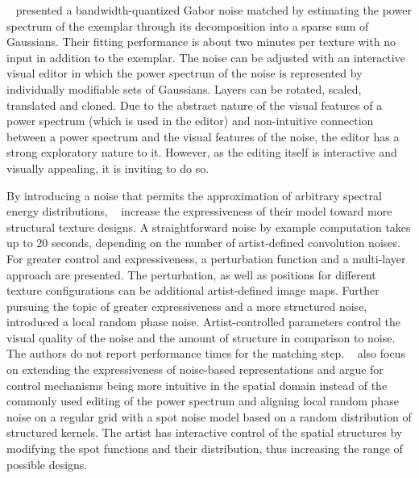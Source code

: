 \citeauthor*{galerne_2012_gne}~\cite{galerne_2012_gne} presented a bandwidth-quantized Gabor noise matched by estimating the power spectrum of the exemplar through its decomposition into a sparse sum of Gaussians. Their fitting performance is about two minutes per texture with no input in addition to the exemplar. The noise can be adjusted with an interactive visual editor in which the power spectrum of the noise is represented by individually modifiable sets of Gaussians. Layers can be rotated, scaled, translated and cloned. Due to the abstract nature of the visual features of a power spectrum (which is used in the editor) and non-intuitive connection between a power spectrum and the visual features of the noise, the editor has a strong exploratory nature to it. However, as the editing itself is interactive and visually appealing, it is inviting to do so. 

By introducing a noise that permits the approximation of arbitrary spectral energy distributions, \citeauthor*{gilet_2012_mkn}~\cite{gilet_2012_mkn} increase the expressiveness of their model toward more structural texture designs. A straightforward noise by example computation takes up to 20 seconds, depending on the number of artist-defined convolution noises. For greater control and expressiveness, a perturbation function and a multi-layer approach are presented. The perturbation, as well as positions for different texture configurations can be additional artist-defined image maps. Further pursuing the topic of greater expressiveness and a more structured noise, \citeauthor*{gilet_2014_lrn}~\cite{gilet_2014_lrn} introduced a local random phase noise. Artist-controlled parameters control the visual quality of the noise and the amount of structure in comparison to noise. The authors do not report performance times for the matching step. \citeauthor*{pavie_2016_pts}~\cite{pavie_2016_pts} also focus on extending the expressiveness of noise-based representations and argue for control mechanisms being more intuitive in the spatial domain instead of the commonly used editing of the power spectrum and aligning local random phase noise on a regular grid with a spot noise model based on a random distribution of structured kernels. The artist has interactive control of the spatial structures by modifying the spot functions and their distribution, thus increasing the range of possible designs.

